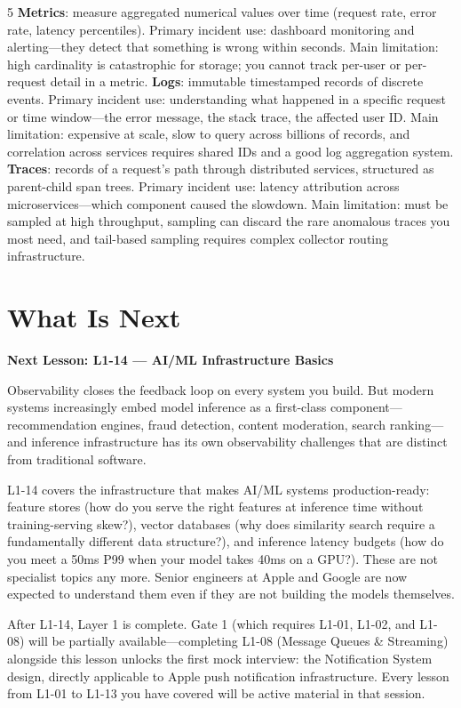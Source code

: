 \documentclass[11pt,a4paper]{article}
\begin{document}
\begin{answerbox}{5}
  \textbf{Metrics}: measure aggregated numerical values over time (request rate, error rate, latency percentiles). Primary incident use: dashboard monitoring and alerting---they detect that something is wrong within seconds. Main limitation: high cardinality is catastrophic for storage; you cannot track per-user or per-request detail in a metric. \textbf{Logs}: immutable timestamped records of discrete events. Primary incident use: understanding what happened in a specific request or time window---the error message, the stack trace, the affected user ID. Main limitation: expensive at scale, slow to query across billions of records, and correlation across services requires shared IDs and a good log aggregation system. \textbf{Traces}: records of a request's path through distributed services, structured as parent-child span trees. Primary incident use: latency attribution across microservices---which component caused the slowdown. Main limitation: must be sampled at high throughput, sampling can discard the rare anomalous traces you most need, and tail-based sampling requires complex collector routing infrastructure.
\end{answerbox}

\newpage
\section{What Is Next}

\begin{insightbox}
  \textbf{Next Lesson: L1-14 --- AI/ML Infrastructure Basics}

  Observability closes the feedback loop on every system you build. But modern systems increasingly embed model inference as a first-class component---recommendation engines, fraud detection, content moderation, search ranking---and inference infrastructure has its own observability challenges that are distinct from traditional software.

  L1-14 covers the infrastructure that makes AI/ML systems production-ready: feature stores (how do you serve the right features at inference time without training-serving skew?), vector databases (why does similarity search require a fundamentally different data structure?), and inference latency budgets (how do you meet a 50ms P99 when your model takes 40ms on a GPU?). These are not specialist topics any more. Senior engineers at Apple and Google are now expected to understand them even if they are not building the models themselves.

  After L1-14, Layer 1 is complete. Gate 1 (which requires L1-01, L1-02, and L1-08) will be partially available---completing L1-08 (Message Queues \& Streaming) alongside this lesson unlocks the first mock interview: the Notification System design, directly applicable to Apple push notification infrastructure. Every lesson from L1-01 to L1-13 you have covered will be active material in that session.
\end{insightbox}
\end{document}
